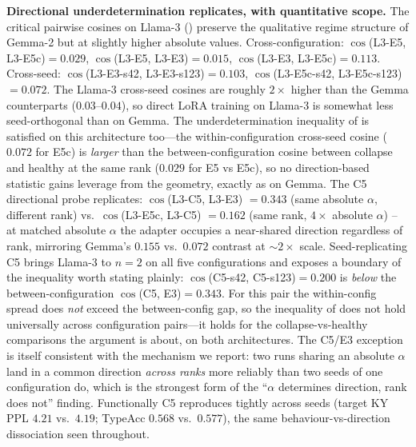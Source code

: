\documentclass[11pt]{article}
\begin{document}
\textbf{Directional underdetermination replicates, with quantitative scope.} The critical pairwise cosines on Llama-3 () preserve the qualitative regime structure of Gemma-2 but at slightly higher absolute values. Cross-configuration: $\cos$(L3-E5, L3-E5c)$=0.029$, $\cos$(L3-E5, L3-E3)$=0.015$, $\cos$(L3-E3, L3-E5c)$=0.113$. Cross-seed: $\cos$(L3-E3-s42, L3-E3-s123)$=0.103$, $\cos$(L3-E5c-s42, L3-E5c-s123)$=0.072$. The Llama-3 cross-seed cosines are roughly $2\times$ higher than the Gemma counterparts ($0.03$--$0.04$), so direct LoRA training on Llama-3 is somewhat less seed-orthogonal than on Gemma. The underdetermination inequality of  is satisfied on this architecture too---the within-configuration cross-seed cosine ($0.072$ for E5c) is \emph{larger} than the between-configuration cosine between collapse and healthy at the same rank ($0.029$ for E5 vs E5c), so no direction-based statistic gains leverage from the geometry, exactly as on Gemma. The C5 directional probe replicates: $\cos$(L3-C5, L3-E3) $=0.343$ (same absolute $\alpha$, different rank) vs.\ $\cos$(L3-E5c, L3-C5) $=0.162$ (same rank, $4\times$ absolute $\alpha$) -- at matched absolute $\alpha$ the adapter occupies a near-shared direction regardless of rank, mirroring Gemma's $0.155$ vs.\ $0.072$ contrast at $\sim 2\times$ scale. Seed-replicating C5 brings Llama-3 to $n{=}2$ on all five configurations and exposes a boundary of the inequality worth stating plainly: $\cos$(C5-s42, C5-s123)$=0.200$ is \emph{below} the between-configuration $\cos$(C5, E3)$=0.343$. For this pair the within-config spread does \emph{not} exceed the between-config gap, so the inequality of  does not hold universally across configuration pairs---it holds for the collapse-vs-healthy comparisons the argument is about, on both architectures. The C5/E3 exception is itself consistent with the mechanism we report: two runs sharing an absolute $\alpha$ land in a common direction \emph{across ranks} more reliably than two seeds of one configuration do, which is the strongest form of the ``$\alpha$ determines direction, rank does not'' finding. Functionally C5 reproduces tightly across seeds (target KY PPL $4.21$ vs.\ $4.19$; TypeAcc $0.568$ vs.\ $0.577$), the same behaviour-vs-direction dissociation seen throughout.
\end{document}
